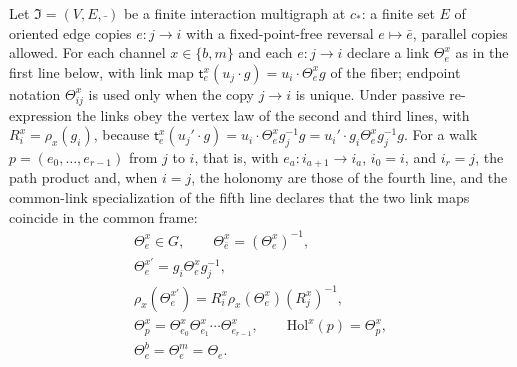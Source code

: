 Let $\mathfrak I=(V,E,\bar{\ })$ be a finite interaction multigraph at $c_*$: a finite set $E$ of
oriented edge copies $e:j\to i$ with a fixed-point-free reversal $e\mapsto\bar e$, parallel copies
allowed. For each channel $x\in\{b,m\}$ and each $e:j\to i$ declare a link $\Theta_e^x$ as in the
first line below, with link map $\mathsf t_e^x(u_j\cdot g)=u_i\cdot\Theta_e^xg$ of the fiber; endpoint
notation $\Theta_{ij}^x$ is used only when the copy $j\to i$ is unique. Under passive re-expression the
links obey the vertex law of the second and third lines, with $R_i^x=\rho_x(g_i)$, because
$\mathsf t_e^x(u_j'\cdot g)=u_i\cdot\Theta_e^xg_j^{-1}g=u_i'\cdot g_i\Theta_e^xg_j^{-1}g$. For a walk
$p=(e_0,\ldots,e_{r-1})$ from $j$ to $i$, that is, with $e_a:i_{a+1}\to i_a$, $i_0=i$, and $i_r=j$, the
path product and, when $i=j$, the holonomy are those of the fourth line, and the common-link
specialization of the fifth line declares that the two link maps coincide in the common frame:
\begin{gather}
\Theta_e^x\in G,
\qquad
\Theta_{\bar e}^x=(\Theta_e^x)^{-1},
\label{eq:geo-regime-two-links}\\
\Theta_e^{x\prime}=g_i\Theta_e^xg_j^{-1},
\label{eq:geo-regime-two-gauge-law}\\
\rho_x(\Theta_e^{x\prime})=R_i^x\rho_x(\Theta_e^x)(R_j^x)^{-1},
\label{eq:gen-represented-gauge-links}\\
\Theta_p^x=\Theta_{e_0}^x\Theta_{e_1}^x\cdots\Theta_{e_{r-1}}^x,
\qquad
\mathrm{Hol}^x(p)=\Theta_p^x,
\label{eq:geo-link-holonomy}\\
\Theta_e^b=\Theta_e^m=\Theta_e.
\label{eq:geo-common-link}
\end{gather}

